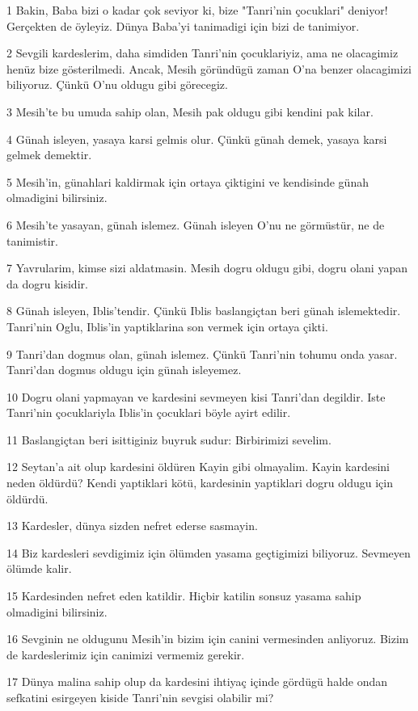 \par 1 Bakin, Baba bizi o kadar çok seviyor ki, bize "Tanri'nin çocuklari" deniyor! Gerçekten de öyleyiz. Dünya Baba'yi tanimadigi için bizi de tanimiyor.
\par 2 Sevgili kardeslerim, daha simdiden Tanri'nin çocuklariyiz, ama ne olacagimiz henüz bize gösterilmedi. Ancak, Mesih göründügü zaman O'na benzer olacagimizi biliyoruz. Çünkü O'nu oldugu gibi görecegiz.
\par 3 Mesih'te bu umuda sahip olan, Mesih pak oldugu gibi kendini pak kilar.
\par 4 Günah isleyen, yasaya karsi gelmis olur. Çünkü günah demek, yasaya karsi gelmek demektir.
\par 5 Mesih'in, günahlari kaldirmak için ortaya çiktigini ve kendisinde günah olmadigini bilirsiniz.
\par 6 Mesih'te yasayan, günah islemez. Günah isleyen O'nu ne görmüstür, ne de tanimistir.
\par 7 Yavrularim, kimse sizi aldatmasin. Mesih dogru oldugu gibi, dogru olani yapan da dogru kisidir.
\par 8 Günah isleyen, Iblis'tendir. Çünkü Iblis baslangiçtan beri günah islemektedir. Tanri'nin Oglu, Iblis'in yaptiklarina son vermek için ortaya çikti.
\par 9 Tanri'dan dogmus olan, günah islemez. Çünkü Tanri'nin tohumu onda yasar. Tanri'dan dogmus oldugu için günah isleyemez.
\par 10 Dogru olani yapmayan ve kardesini sevmeyen kisi Tanri'dan degildir. Iste Tanri'nin çocuklariyla Iblis'in çocuklari böyle ayirt edilir.
\par 11 Baslangiçtan beri isittiginiz buyruk sudur: Birbirimizi sevelim.
\par 12 Seytan'a ait olup kardesini öldüren Kayin gibi olmayalim. Kayin kardesini neden öldürdü? Kendi yaptiklari kötü, kardesinin yaptiklari dogru oldugu için öldürdü.
\par 13 Kardesler, dünya sizden nefret ederse sasmayin.
\par 14 Biz kardesleri sevdigimiz için ölümden yasama geçtigimizi biliyoruz. Sevmeyen ölümde kalir.
\par 15 Kardesinden nefret eden katildir. Hiçbir katilin sonsuz yasama sahip olmadigini bilirsiniz.
\par 16 Sevginin ne oldugunu Mesih'in bizim için canini vermesinden anliyoruz. Bizim de kardeslerimiz için canimizi vermemiz gerekir.
\par 17 Dünya malina sahip olup da kardesini ihtiyaç içinde gördügü halde ondan sefkatini esirgeyen kiside Tanri'nin sevgisi olabilir mi?
